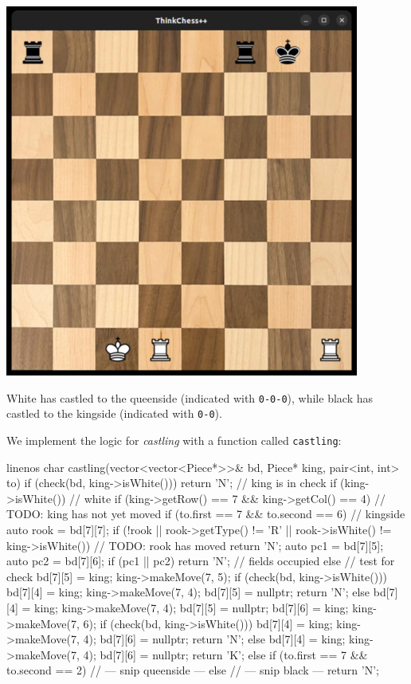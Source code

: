 \begin{center}
\includegraphics[width=.5\linewidth]{img/castling2.jpg}
\end{center}

White has castled to the queenside (indicated with \texttt{0-0-0}), while black has castled to
the kingside (indicated with \texttt{0-0}).

We implement the logic for \emph{castling} with a function called \texttt{castling}:

\begin{cpp*}{linenos}
char castling(vector<vector<Piece*>>& bd,
              Piece* king, pair<int, int> to)
{
  if (check(bd, king->isWhite())) return 'N'; // king is in check
  if (king->isWhite()) { // white
    if (king->getRow() == 7 && king->getCol() == 4) {
      // TODO: king has not yet moved
      if (to.first == 7 && to.second == 6) { // kingside
        auto rook = bd[7][7];
        if (!rook || rook->getType() != 'R'
                  || rook->isWhite() != king->isWhite()) {
          // TODO: rook has moved
          return 'N';
        }
        auto pc1 = bd[7][5];
        auto pc2 = bd[7][6];
        if (pc1 || pc2) return 'N'; // fields occupied
        else {
          // test for check
          bd[7][5] = king;
          king->makeMove(7, 5);
          if (check(bd, king->isWhite())) {
            bd[7][4] = king;
            king->makeMove(7, 4);
            bd[7][5] = nullptr;
            return 'N';
          } else {
            bd[7][4] = king;
            king->makeMove(7, 4);
            bd[7][5] = nullptr;
          }
          bd[7][6] = king;
          king->makeMove(7, 6);
          if (check(bd, king->isWhite())) {
            bd[7][4] = king;
            king->makeMove(7, 4);
            bd[7][6] = nullptr;
            return 'N';
          } else {
            bd[7][4] = king;
            king->makeMove(7, 4);
            bd[7][6] = nullptr;
          }
          return 'K';
        }
      } else if (to.first == 7 && to.second == 2) {
      // --- snip queenside ---
      }
    }
  } else {
  // --- snip black ---
  }
  return 'N';
}
\end{cpp*}

